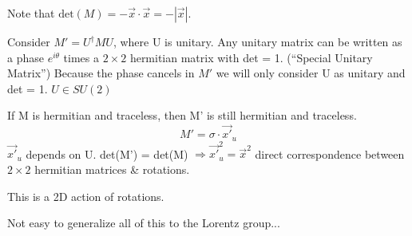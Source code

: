 {Note that $\textrm{det}(M) = - \vec{x}\cdot\vec{x} = - |\vec{x}|$.

Consider $M'=U^{\dagger}MU$, where U is unitary.
Any unitary matrix can be written as a phase $e^{i\theta}$ times a $2\times2$ hermitian matrix with det = 1.  (``Special Unitary Matrix'')
Because the phase cancels in $M'$ we will only consider U as unitary and det = 1. 
$U \in SU(2)$

If M is hermitian and traceless, then M' is still hermitian and traceless.
\begin{equation*}
M' = \sigma \cdot \vec{x'}_u
\end{equation*}
$\vec{x'}_{u} $ depends on U.  det(M') = det(M) $\Rightarrow \vec{x'}_u^2 = {\vec{x}}^2 $%
direct correspondence between $2\times2$ hermitian matrices \& rotations.

This is a 2D action of rotations.

Not easy to generalize all of this to the Lorentz group...

}



